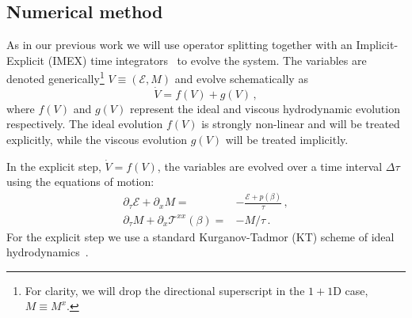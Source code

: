 \documentclass[12pt,aps,preprint,nofootinbib,noshowkeys,noshowpacs,longbibliography,superscriptaddress,tightenlines]{revtex4-2}
\def\edense{{\mathcal{E}}}
\def\pdense{M}
\def\st{\begin{equation}}
\def\stp{\end{equation}}
\def\tideal{{\mathcal T}}
\newcommand{\cmtJF}[1]{{\color{blue}JF: #1}}
\begin{document}



\subsection{Numerical method}
\label{sec:numerics}

As in our previous work we will use operator splitting together with an Implicit-Explicit (IMEX) time integrators~\cite{ASCHER1997151,Pareschi2005,Constantinescu} to
evolve the system.
The variables
are denoted generically\footnote{For clarity, we will drop the directional superscript in the $1+1$D case,  $\pdense \equiv \pdense^x$.  } $V \equiv(\edense, \pdense)$ and evolve schematically as
\st
  \dot V = f(V) + g(V)\,,
\stp
where $f(V)$ and $g(V)$ represent the ideal and viscous hydrodynamic evolution respectively.
The ideal evolution $f(V)$ is strongly non-linear and will be treated explicitly, while the viscous evolution $g(V)$ will be 
treated implicitly.

In the explicit step, $\dot V = f(V)$,  the variables are evolved over
a time interval $\Delta \tau$ using the equations of motion:
  \begin{subequations}
  \label{eq:FofV}
\begin{align}
  \partial_\tau \edense + \partial_x \pdense =& - \frac{\edense + p(\beta) }{\tau}\, ,   \\
    \partial_\tau \pdense + \partial_x \tideal^{xx}(\beta) =& - \pdense/\tau \, . 
\end{align}
  \end{subequations}
For the explicit step we use a standard Kurganov-Tadmor (KT) scheme of ideal hydrodynamics~\cite{KTScheme,KTAstro,Schenke}.
\end{document}
